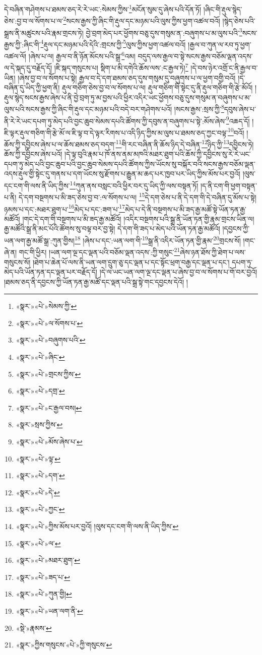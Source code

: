 དེ་བཞིན་གཤེགས་པ་ཐམས་ཅད་རེ་རེ་ཡང་:སེམས་ཀྱིས་\footnote{«སྣར་»«པེ་»སེམས་ཀྱི་}མངོན་སུམ་དུ་ཞེས་པའི་དོན་ཏོ། །ཞིང་གི་རྡུལ་སྙེད་ཅེས་:བྱ་བ་ལ་སོགས་པ་ལ་\footnote{«སྣར་»«པེ་»ལ་སོགས་པ་}སངས་རྒྱས་ཀྱི་ཞིང་གི་རྡུལ་དང་མཉམ་པའི་ལུས་ཀྱིས་ཕྱག་འཚལ་བའོ། །སྙེད་ཅེས་པའི་སྒྲས་ནི་མཚུངས་པའི་རྣམ་གྲངས་ཏེ། བྱེ་བྲག་མེད་པར་ཕྱོགས་བཅུ་དུས་གསུམ་ན་:བཞུགས་པ་མ་ལུས་པའི་\footnote{«སྣར་»«པེ་»བཞུགས་པའི་}སངས་རྒྱས་ཀྱི་:ཞིང་གི་\footnote{«སྣར་»«པེ་»ཞིང་}རྡུལ་དང་མཉམ་པའི་དེའི་:གྲངས་ཀྱི་\footnote{«སྣར་»«པེ་»གྲངས་ཀྱིས་}ལུས་ཀྱིས་ཕྱག་འཚལ་བའོ། །རྒྱལ་བ་ཀུན་ལ་རབ་ཏུ་ཕྱག་འཚལ་ལོ། །ཞེས་པ་ལ། རྒྱལ་བ་ནི་ཉོན་མོངས་པའི་སྒྲ་\footnote{«སྣར་»«པེ་»དགྲ་}འམ། བདུད་ལས་རྒྱལ་བ་སྟེ་སངས་རྒྱས་བཅོམ་ལྡན་འདས་ལ་དེ་སྐད་དུ་བརྗོད་དོ། །ཇི་སྐད་གསུངས་པ། སྡིག་པ་མི་དགེའི་ཆོས་ལས་:ང་རྒྱལ་ཏེ།\footnote{«སྣར་»«པེ་»ང་རྒྱལ་བས།} །དེ་བས་ཉེར་འགྲོ་ང་ནི་རྒྱལ་བ་ཡིན། །ཞེས་བྱ་བ་ལ་སོགས་པ་སྟེ། རྒྱལ་བ་དེ་དག་ཐམས་ཅད་དུས་གསུམ་དུ་བཞུགས་པ་ལ་ཕྱག་བགྱི་བའོ། །དེ་བཞིན་དུ་ཡིད་ཀྱི་ཕྱག་ནི། རྡུལ་གཅིག་ཅེས་བྱ་བ་ལ་སོགས་པ་ལ། རྡུལ་གཅིག་གི་སྟེང་དུ་ནི་རྡུལ་གཅིག་གི་རྩེ་མོའོ། །རྡུལ་སྙེད་སངས་རྒྱས་ཞེས་པ་ནི་བྱེ་བྲག་ཏུ་མ་བྱས་པའི་ཕྱིར་འདིར་ཡང་ཕྱོགས་བཅུ་དུས་གསུམ་ན་བཞུགས་པ་མ་ལུས་པའི་སངས་རྒྱས་ཀྱི་ཞིང་གི་རྡུལ་དང་མཉམ་པའི་བདེ་བར་གཤེགས་པའོ། །སངས་རྒྱས་:སྲས་ཀྱི་\footnote{«སྣར་»སྲས་ཀྱིས་}དབུས་ཞེས་པ་ནི་རེ་རེ་ཡང་དཔག་ཏུ་མེད་པའི་བྱང་ཆུབ་སེམས་དཔའི་ཚོགས་ཀྱི་དབུས་ན་བཞུགས་པ་སྟེ་:མོས་ཞེས་\footnote{«སྣར་»«པེ་»མོས་ཞེས་པ་}འཆད་དོ། །ཇི་ལྟར་རྡུལ་གཅིག་གི་རྩེ་མོ་ལ་ཇི་ལྟ་བ་དེ་ལྟར་རིགས་པ་འདི་ཉིད་ཀྱིས་མ་ལུས་པ་ཐམས་ཅད་ཀྱང་བལྟ་\footnote{«སྣར་»«པེ་»ལྟ་}བའོ། །ཆོས་ཀྱི་དབྱིངས་ཞེས་པ་ལ་ཆོས་ཐམས་ཅད་བདག་\footnote{«སྣར་»«པེ་»དག་}གི་རང་བཞིན་ནི་ཆོས་ཉིད་དེ་བཞིན་\footnote{«སྣར་»«པེ་»དེ་}ཉིད་ཀྱི་\footnote{«སྣར་»«པེ་»ཀྱང་}དབྱིངས་ཏེ། ཆོས་ཀྱི་དབྱིངས་ཞེས་པའོ། །དེ་ལྟ་བུའི་རྣམ་པ་ཁོ་ནས་ནམ་མཁའི་མཐར་ཐུག་པའི་ཆོས་ཀྱི་དབྱིངས་སུ་རེ་རེ་ཡང་དཔག་ཏུ་མེད་པའི་བྱང་ཆུབ་པའི་བྱང་ཆུབ་སེམས་དཔའི་ཚོགས་ཀྱིས་ཡོངས་སུ་བསྐོར་བའི་སངས་རྒྱས་བཅོམ་ལྡན་འདས་རྡུལ་གྱི་སྟེང་དུ་གནས་པ་དག་ཡོངས་སུ་རྫོགས་པ་རྒྱུན་མ་ཆད་པར་ཁྱབ་པར་ཡིད་ཀྱིས་མོས་པར་བྱའོ། །ལུས་དང་ངག་གི་ལས་ནི་ཡིད་ཀྱིས་\footnote{«སྣར་»«པེ་»ཀྱིས་མོས་པར་བྱའོ། །ལུས་དང་ངག་གི་ལས་ནི་ཡིད་ཀྱིས་}ཀུན་ནས་བསླང་བའི་ཕྱིར་བར་དུ་ཡིད་ཀྱི་ལས་བསྟན་ཏོ། །ད་ནི་ངག་གི་ཕྱག་བསྟན་པ་ནི། དེ་དག་བསྔགས་པ་མི་ཟད་ཅེས་བྱ་བ་:ལ་སོགས་པ་ལ། \footnote{«སྣར་»«པེ་»ལ་}དེ་དག་ཅེས་པ་ནི་དེ་དག་གི་དེ་བཞིན་དུ་མོས་པ་སྟེ། ཉམས་པ་དང་:མཐར་ཐུག་པ་\footnote{«སྣར་»«པེ་»མཐར་ཐུག་}མེད་པ་དང་:ཟག་པ་\footnote{«སྣར་»«པེ་»ཟད་པ་}མེད་པ་དེ་ནི་བསྔགས་པ་མི་ཟད་རྒྱ་མཚོ་སྟེ་ཡོན་ཏན་རྒྱ་མཚོའོ། །གང་དེ་དག་གི་བསྔགས་པ་མི་ཟད་རྒྱ་མཚོའོ། །འདིར་བསྔགས་པའི་སྒྲ་ནི་ཡོན་ཏན་གྱི་རྣམ་གྲངས་ཡིན་ལ། རྒྱ་མཚོའི་སྒྲ་ནི་མང་པོའི་ཚོགས་སུ་བལྟ་བར་བྱ་སྟེ། དེ་དག་གི་ཟད་པ་མེད་པའི་ཡོན་ཏན་རྒྱ་མཚོའོ། །དབྱངས་ཀྱི་ཡན་ལག་རྒྱ་མཚོ་སྒྲ་:ཀུན་གྱིས།\footnote{«སྣར་»«པེ་»ཀུན་གྱི།} །ཞེས་པ་དང་:ཡན་ལག་གི་\footnote{«སྣར་»«པེ་»ཡན་ལག་ནི་}སྒྲ་ནི་འདིར་ཡོན་ཏན་གྱི་རྣམ་\footnote{«སྡེ་»རྣམས་}གྲངས་སོ། །གང་ཞེ་ན། གང་གི་ཕྱིར། །ཡན་ལག་ལྔ་དང་ལྡན་པའི་བཅོམ་ལྡན་འདས་:ཀྱི་གསུང་\footnote{«སྣར་»ཀྱིས་གསུངས་«པེ་»ཀྱི་གསུངས་}ཞེས་ཉན་ཐོས་ཀྱི་ཐེག་པ་ལས་གསུངས་སོ། །ཐེག་པ་ཆེན་པོ་ལས་ནི་ཡན་ལག་དྲུག་ཅུ་དང་ལྡན་པ་དང་སྟོང་ཕྲག་བརྒྱ་དང་ལྡན་པ་དང་། དཔག་ཏུ་མེད་པའི་ཡོན་ཏན་དང་ལྡན་པར་བརྗོད་དོ། །དེ་ལ་ཡང་ཡན་ལག་ལྔ་དང་ལྡན་པ་ཞེས་བྱ་བ་ལ་སོགས་པ་གོ་བར་བྱའོ། །ཐམས་ཅད་ནི་དབྱངས་ཀྱི་ཡོན་ཏན་རྒྱ་མཚོ་དང་ལྡན་པའི་སྒྲ་སྟེ་གང་དབྱངས་དེའོ། །
